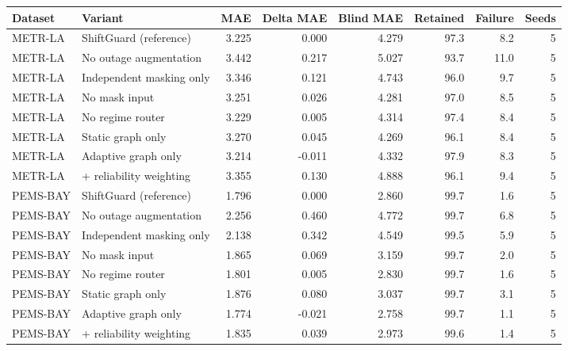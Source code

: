 \begin{tabular}{llrrrrrr}
\toprule
Dataset & Variant & MAE & Delta MAE & Blind MAE & Retained & Failure & Seeds \\
\midrule
METR-LA & ShiftGuard (reference) & 3.225 & 0.000 & 4.279 & 97.3 & 8.2 & 5 \\
METR-LA & No outage augmentation & 3.442 & 0.217 & 5.027 & 93.7 & 11.0 & 5 \\
METR-LA & Independent masking only & 3.346 & 0.121 & 4.743 & 96.0 & 9.7 & 5 \\
METR-LA & No mask input & 3.251 & 0.026 & 4.281 & 97.0 & 8.5 & 5 \\
METR-LA & No regime router & 3.229 & 0.005 & 4.314 & 97.4 & 8.4 & 5 \\
METR-LA & Static graph only & 3.270 & 0.045 & 4.269 & 96.1 & 8.4 & 5 \\
METR-LA & Adaptive graph only & 3.214 & -0.011 & 4.332 & 97.9 & 8.3 & 5 \\
METR-LA & + reliability weighting & 3.355 & 0.130 & 4.888 & 96.1 & 9.4 & 5 \\
PEMS-BAY & ShiftGuard (reference) & 1.796 & 0.000 & 2.860 & 99.7 & 1.6 & 5 \\
PEMS-BAY & No outage augmentation & 2.256 & 0.460 & 4.772 & 99.7 & 6.8 & 5 \\
PEMS-BAY & Independent masking only & 2.138 & 0.342 & 4.549 & 99.5 & 5.9 & 5 \\
PEMS-BAY & No mask input & 1.865 & 0.069 & 3.159 & 99.7 & 2.0 & 5 \\
PEMS-BAY & No regime router & 1.801 & 0.005 & 2.830 & 99.7 & 1.6 & 5 \\
PEMS-BAY & Static graph only & 1.876 & 0.080 & 3.037 & 99.7 & 3.1 & 5 \\
PEMS-BAY & Adaptive graph only & 1.774 & -0.021 & 2.758 & 99.7 & 1.1 & 5 \\
PEMS-BAY & + reliability weighting & 1.835 & 0.039 & 2.973 & 99.6 & 1.4 & 5 \\
\bottomrule
\end{tabular}
